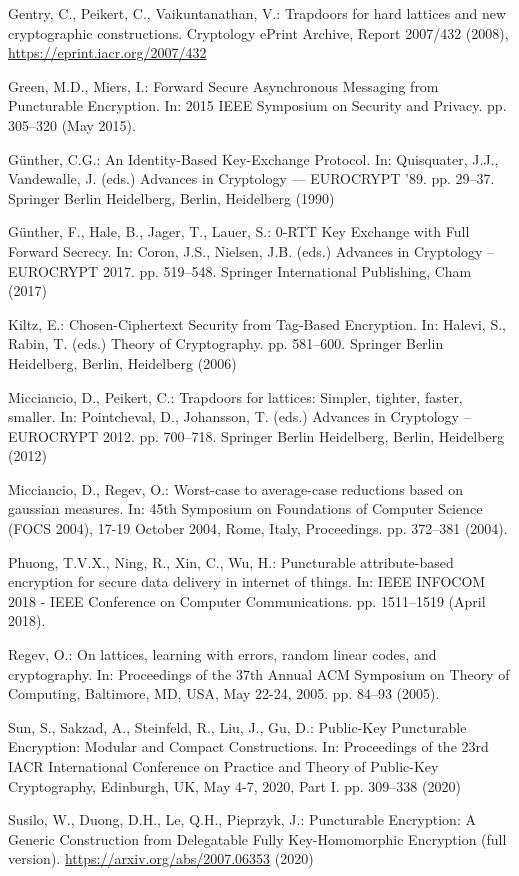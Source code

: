 \documentclass[runningheads,10pt]{llncs}
\begin{document}
\begin{thebibliography}{10}
	Gentry, C., Peikert, C., Vaikuntanathan, V.: Trapdoors for hard lattices and
	new cryptographic constructions. Cryptology ePrint Archive, Report 2007/432
	(2008), \url{https://eprint.iacr.org/2007/432}
	
	{Green}, M.D., {Miers}, I.: {Forward Secure Asynchronous Messaging from
		Puncturable Encryption}. In: 2015 IEEE Symposium on Security and Privacy. pp.
	305--320 (May 2015). 
	
	G{\"u}nther, C.G.: {An Identity-Based Key-Exchange Protocol}. In: Quisquater,
	J.J., Vandewalle, J. (eds.) Advances in Cryptology --- EUROCRYPT '89. pp.
	29--37. Springer Berlin Heidelberg, Berlin, Heidelberg (1990)
	
	G{\"u}nther, F., Hale, B., Jager, T., Lauer, S.: {0-RTT Key Exchange with Full
		Forward Secrecy}. In: Coron, J.S., Nielsen, J.B. (eds.) Advances in
	Cryptology -- EUROCRYPT 2017. pp. 519--548. Springer International
	Publishing, Cham (2017)
	
	Kiltz, E.: {{Chosen-Ciphertext Security from Tag-Based Encryption}}. In:
	Halevi, S., Rabin, T. (eds.) Theory of Cryptography. pp. 581--600. Springer
	Berlin Heidelberg, Berlin, Heidelberg (2006)
	
	Micciancio, D., Peikert, C.: Trapdoors for lattices: Simpler, tighter, faster,
	smaller. In: Pointcheval, D., Johansson, T. (eds.) Advances in Cryptology --
	EUROCRYPT 2012. pp. 700--718. Springer Berlin Heidelberg, Berlin, Heidelberg
	(2012)
	
	Micciancio, D., Regev, O.: Worst-case to average-case reductions based on
	gaussian measures. In: 45th Symposium on Foundations of Computer Science
	{(FOCS} 2004), 17-19 October 2004, Rome, Italy, Proceedings. pp. 372--381
	(2004). 
	
	{Phuong}, T.V.X., {Ning}, R., {Xin}, C., {Wu}, H.: Puncturable attribute-based
	encryption for secure data delivery in internet of things. In: IEEE INFOCOM
	2018 - IEEE Conference on Computer Communications. pp. 1511--1519 (April
	2018). 
	
	Regev, O.: On lattices, learning with errors, random linear codes, and
	cryptography. In: Proceedings of the 37th Annual {ACM} Symposium on Theory of
	Computing, Baltimore, MD, USA, May 22-24, 2005. pp. 84--93 (2005).
	
	Sun, S., Sakzad, A., Steinfeld, R., Liu, J., Gu, D.: {Public-Key Puncturable
		Encryption: Modular and Compact Constructions}. In: Proceedings of the 23rd {IACR} International Conference
	on Practice and Theory of Public-Key Cryptography, Edinburgh, UK,
May 4-7, 2020,  Part {I}. pp. 309--338 (2020)
	
	Susilo, W., Duong, D.H., Le, Q.H., Pieprzyk, J.: {Puncturable Encryption: A
		Generic Construction from Delegatable Fully Key-Homomorphic Encryption (full
		version)}. \url{https://arxiv.org/abs/2007.06353} (2020)
	

	
\end{thebibliography}
\end{document}
